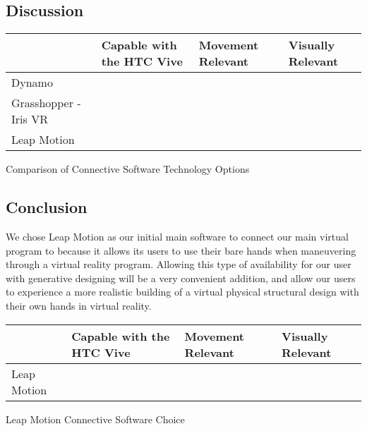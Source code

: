 \documentclass[letterpaper,10pt,onecolumn,compsoc]{IEEEtran}
\begin{document}
\subsection{Discussion}

\begin{center}
\begin{tabular}{ | P{3.5cm} | P{4.5cm} | P{3.5cm} | P{3cm} | } 
 	\hline
 	 & Capable with the HTC Vive & Movement Relevant & Visually Relevant \\ 
 	\hline
 	Dynamo & \checkmark & & \checkmark \\ 
 	\hline
 	Grasshopper - Iris VR & \checkmark & & \checkmark \\ 
 	\hline
 	Leap Motion & \checkmark & \checkmark & \\ 
 	\hline
\end{tabular}
\end{center}

\begin{center}
Comparison of Connective Software Technology Options
\end{center}

\newpage

\subsection{Conclusion}

\noindent
We chose Leap Motion as our initial main software to connect our main virtual program to because it allows its users to use their bare hands when maneuvering through a virtual reality program. Allowing this type of availability for our user with generative designing will be a very convenient addition, and allow our users to experience a more realistic building of a virtual physical structural design with their own hands in virtual reality.


\begin{center}
\begin{tabular}{ | P{3.5cm} | P{4.5cm} | P{3.5cm} | P{3cm} | } 
 	\hline
 	 & Capable with the HTC Vive & Movement Relevant & Visually Relevant \\ 
 	\hline 		
 	Leap Motion & \checkmark & \checkmark & \\ 
 	\hline
\end{tabular}
\end{center}

\begin{center}
Leap Motion Connective Software Choice
\end{center}
\end{document}
